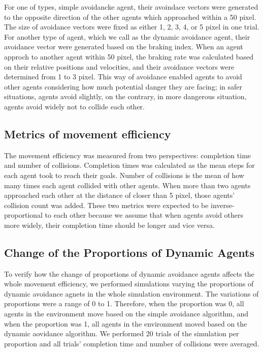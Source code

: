 \documentclass[letterpaper, 10 pt, conference]{ieeeconf}  %
\begin{document}
For one of types, simple avoidancke agent, their avoindace vectors were generated to the opposite direction of the other agents which approached within a 50 pixel. The size of avoidance vectors were fixed as either 1, 2, 3, 4, or 5 pixel in one trial. 
For another type of agent, which we call as the dynamic avoidance agent, their avoidance vector were generated based on the braking index. When an agent approch to another agent within 50 pixel, the braking rate was calculated based on their relative positions and velocities, and their avoidance vectors were determined from 1 to 3 pixel. This way of avoidance enabled agents to avoid other agents considering how much potential danger they are facing; in safer situations, agents avoid slightly, on the contrary, in more dangerous situation, agents avoid widely not to collide each other. 

\subsection{Metrics of movement efficiency}
The movement efficiency was measured from two perspectives: completion time and number of collisions. Completion times was calculated as the mean steps for each agent took to reach their goals. Number of collisions is the mean of how many times each agent collided with other agents. When more than two agents approached each other at the distance of closer than 5 pixel, those agents' collision count was added. These two metrics were expected to be inverse-proportional to each other because we assume that when agents avoid others more widely, their completion time should be longer and vice versa. 

\subsection{Change of the Proportions of Dynamic Agents}
To verify how the change of proportions of dynamic avoidance agents affects the whole movement efficiency, we performed simulations varying the proportions of dynamic avoidance agnets in the whole simulation environment. The variations of proportions were a range of 0 to 1. Therefore, when the proportion was 0, all agents in the environment move based on the simple avoidance algorithm, and when the proportion was 1, all agents in the environment moved based on the dynamic aovidance algorithm. We performed 20 trials of the simulation per proportion and all trials' completion time and number of collisions were averaged.
\end{document}
